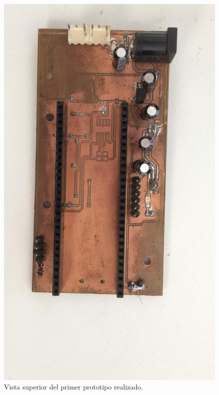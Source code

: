 \begin{figure}[!htbp]
	\centering
	
	\begin{minipage}{0.5\textwidth}
		\includegraphics[width=\textwidth]{./Figures/prototipo11.jpeg}		
	\end{minipage}		
	
	\caption{Vista superior del primer prototipo realizado.}
	\label{fig:prototipo1sup}
\end{figure}


